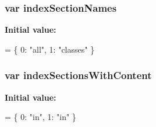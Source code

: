 \subsubsection[{index\-Section\-Names}]{\setlength{\rightskip}{0pt plus 5cm}var index\-Section\-Names}\label{data_structures_2html_2search_2search_8js_a77149ceed055c6c6ce40973b5bdc19ad}
{\bfseries Initial value\-:}
\begin{DoxyCode}
=
\{
  0: \textcolor{stringliteral}{"all"},
  1: \textcolor{stringliteral}{"classes"}
\}
\end{DoxyCode}
\subsubsection[{index\-Sections\-With\-Content}]{\setlength{\rightskip}{0pt plus 5cm}var index\-Sections\-With\-Content}\label{data_structures_2html_2search_2search_8js_a6250af3c9b54dee6efc5f55f40c78126}
{\bfseries Initial value\-:}
\begin{DoxyCode}
=
\{
  0: \textcolor{stringliteral}{"in"},
  1: \textcolor{stringliteral}{"in"}
\}
\end{DoxyCode}
